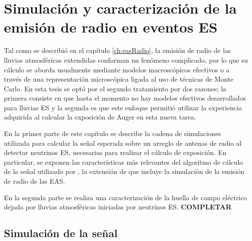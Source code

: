 \chapter{Simulaci\'on y caracterizaci\'on de la emisi\'on de radio en eventos ES}
\label{ch:simulacionRadio}

Tal como se describi\'o en el cap\'itulo \ref{ch:easRadio}, la emisi\'on de radio de las lluvias atmosf\'ericas extendidas conforman un fen\'omeno complicado, por lo que su c\'alculo se aborda usualmente mediante modelos macrosc\'opicos efectivos o a trav\'es de una representaci\'on microsc\'opica ligada al uso de t\'ecnicas de Monte Carlo.
En esta tesis se opt\'o por el segundo tratamiento por dos razones; la primera consiste en que hasta el momento no hay modelos efectivos desarrollados para lluvias ES y la segunda es que este enfoque permiti\'o utilizar la experiencia adquirida al calcular la exposici\'on de Auger en esta nueva tarea.

En la primer parte de este cap\'itulo se describe la cadena de simulaciones utilizada para calcular la se\~nal esperada sobre un arreglo de antenas de radio al detectar neutrinos ES, necesarias para realizar el c\'alculo de exposici\'on.
En particular, se exponen las caracter\'isticas m\'as relevantes del algoritmo de c\'alculo de la se\~nal utilizado por \zhs{}, la extensi\'on de \aires{} que incluye la simulaci\'on de la emisi\'on de radio de las EAS.

En la segunda parte se realiza una caracterizaci\'on de la huella de campo el\'ectrico dejada por lluvias atmosf\'ericas iniciadas por neutrinos ES.
\textbf{COMPLETAR}

\section{Simulaci\'on de la se\~nal}
\label{sc:simRadio}
	
